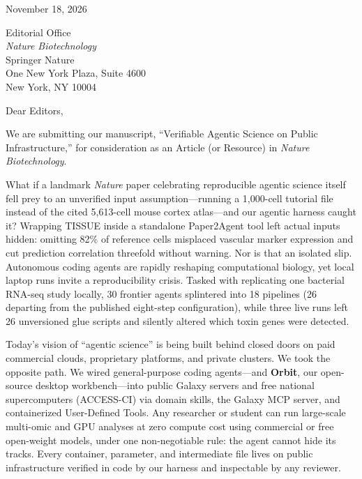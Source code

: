 \documentclass[11pt]{article}
\begin{document}
November 18, 2026

\vspace{0.2em}
Editorial Office\\
\textit{Nature Biotechnology}\\
Springer Nature\\
One New York Plaza, Suite 4600\\
New York, NY 10004

\vspace{0.2em}
Dear Editors,

We are submitting our manuscript, ``Verifiable Agentic Science on Public Infrastructure,'' for consideration as an Article (or Resource) in \textit{Nature Biotechnology}.

What if a landmark \textit{Nature} paper celebrating reproducible agentic science itself fell prey to an unverified input assumption---running a 1,000-cell tutorial file instead of the cited 5,613-cell mouse cortex atlas---and our agentic harness caught it? Wrapping \textsf{TISSUE} inside a standalone \textsf{Paper2Agent} tool left actual inputs hidden: omitting 82\% of reference cells misplaced vascular marker expression and cut prediction correlation threefold without warning. Nor is that an isolated slip. Autonomous coding agents are rapidly reshaping computational biology, yet local laptop runs invite a reproducibility crisis. Tasked with replicating one bacterial RNA-seq study locally, 30 frontier agents splintered into 18 pipelines (26 departing from the published eight-step configuration), while three live runs left 26 unversioned glue scripts and silently altered which toxin genes were detected.

Today's vision of ``agentic science'' is being built behind closed doors on paid commercial clouds, proprietary platforms, and private clusters. We took the opposite path. We wired general-purpose coding agents---and \textbf{\textsf{Orbit}}, our open-source desktop workbench---into public Galaxy servers and free national supercomputers (ACCESS-CI) via domain skills, the Galaxy MCP server, and containerized User-Defined Tools. Any researcher or student can run large-scale multi-omic and GPU analyses at zero compute cost using commercial or free open-weight models, under one non-negotiable rule: the agent cannot hide its tracks. Every container, parameter, and intermediate file lives on public infrastructure verified in code by our harness and inspectable by any reviewer.
\end{document}
